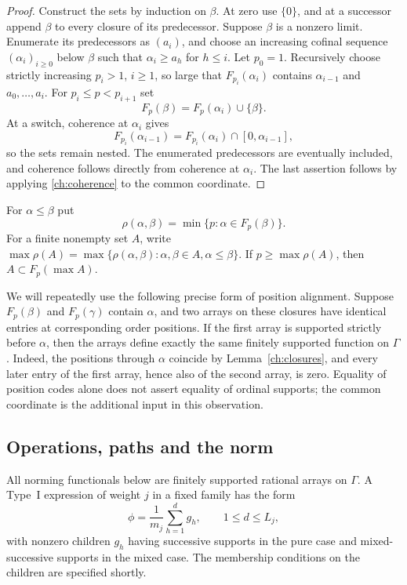 \begin{proof}
Construct the sets by induction on $\beta$.  At zero use $\{0\}$, and at
a successor append $\beta$ to every closure of its predecessor.  Suppose
$\beta$ is a nonzero limit.  Enumerate its predecessors as $(a_i)$, and
choose an increasing cofinal sequence $(\alpha_i)_{i\ge0}$ below $\beta$
such that $\alpha_i\ge a_h$ for $h\le i$.
Let $p_0=1$.  Recursively choose strictly increasing $p_i>1$, $i\ge1$,
so large that $F_{p_i}(\alpha_i)$ contains $\alpha_{i-1}$ and
$a_0,\ldots,a_i$.  For $p_i\le p<p_{i+1}$ set
\[
 F_p(\beta)=F_p(\alpha_i)\cup\{\beta\}.
\]
At a switch, coherence at $\alpha_i$ gives
\[
 F_{p_i}(\alpha_{i-1})
 =F_{p_i}(\alpha_i)\cap[0,\alpha_{i-1}],
\]
so the sets remain nested.  The enumerated predecessors are eventually
included, and coherence follows directly from coherence at $\alpha_i$.
The last assertion follows by applying \eqref{ch:coherence} to the common
coordinate.
\end{proof}

For $\alpha\le\beta$ put
\[
 \rho(\alpha,\beta)=\min\{p:\alpha\in F_p(\beta)\}.
\]
For a finite nonempty set $A$, write
$\max\rho(A)=\max\{\rho(\alpha,\beta):\alpha,\beta\in A,
\alpha\le\beta\}$.  If $p\ge\max\rho(A)$, then
$A\subset F_p(\max A)$.

We will repeatedly use the following precise form of position alignment.
Suppose $F_p(\beta)$ and $F_p(\gamma)$ contain $\alpha$, and two arrays
on these closures have identical entries at corresponding order positions.
If the first array is supported strictly before $\alpha$, then the arrays
define exactly the same finitely supported function on $\Gamma$.
Indeed, the positions through $\alpha$ coincide by
Lemma~\ref{ch:closures}, and every later entry of the first array, hence
also of the second array, is zero.  Equality of position codes alone does
not assert equality of ordinal supports; the common coordinate is the
additional input in this observation.

\subsection{Operations, paths and the norm}

All norming functionals below are finitely supported rational arrays on
$\Gamma$.  A Type~I expression of weight $j$ in a fixed family has the
form
\begin{equation}
 \phi=\frac1{m_j}\sum_{h=1}^{d}g_h,
 \qquad 1\le d\le L_j,
 \label{ch:type-i}
\end{equation}
with nonzero children $g_h$ having successive supports in the pure case
and mixed-successive supports in the mixed case.  The membership
conditions on the children are specified shortly.

